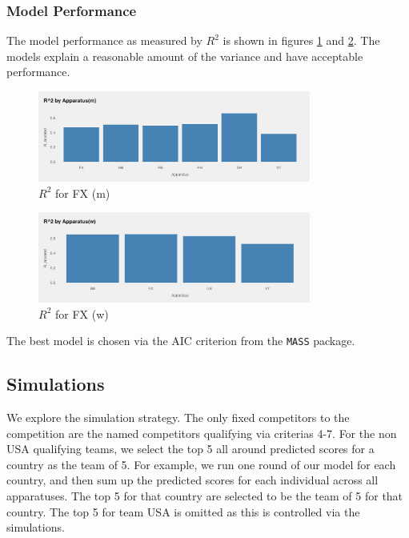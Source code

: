 \documentclass{article}
\begin{document}
\subsubsection{Model Performance}
The model performance as measured by $R^2$ is shown in figures \ref{fig:m_r2}
and \ref{fig:w_r2}. The models explain a reasonable amount of the variance and 
have acceptable performance.

\begin{figure}[H]
    \centering
    \includegraphics[width=0.8\textwidth]{../plots/m_r2.png}
    \caption{$R^2$ for FX (m)}
    \label{fig:m_r2}
\end{figure}

\begin{figure}[H]
    \centering
    \includegraphics[width=0.8\textwidth]{../plots/w_r2.png}
    \caption{$R^2$ for FX (w)}
    \label{fig:w_r2}
\end{figure}
\noindent The best model is chosen via the AIC criterion from the \texttt{MASS} package.

\subsection{Simulations}

We explore the simulation strategy. The only fixed competitors to the competition 
are the named competitors qualifying via criterias 4-7. For the non USA qualifying teams, 
we select the top 5 all around predicted scores for a country as the team of 5. For example, 
we run one round of our model for each country, and then sum up the predicted scores 
for each individual across all apparatuses. The top 5 for that country are selected to 
be the team of 5 for that country. The top 5 for team USA is omitted as this 
is controlled via the simulations.
\end{document}
